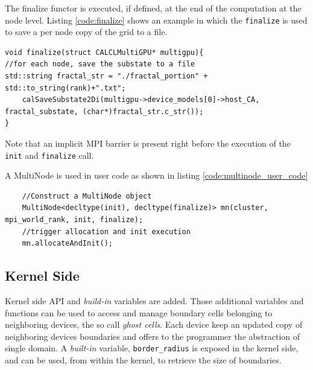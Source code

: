 The finalize functor is executed, if defined, at the end of the computation at the node level. Listing \ref{code:finalize} shows an example in which the \texttt{finalize} is used to save a per node copy of the grid to a file.
\begin{lstlisting}
void finalize(struct CALCLMultiGPU* multigpu){
//for each node, save the substate to a file
std::string fractal_str = "./fractal_portion" + std::to_string(rank)+".txt";
	calSaveSubstate2Di(multigpu->device_models[0]->host_CA, fractal_substate, (char*)fractal_str.c_str());
}
\end{lstlisting}
Note that an implicit MPI barrier is present right before the execution of the \texttt{init} and \texttt{finalize} call.

A MultiNode is used in user code as shown in listing \ref{code:multinode_user_code}

\begin{lstlisting}
	//Construct a MultiNode object
	MultiNode<decltype(init), decltype(finalize)> mn(cluster, mpi_world_rank, init, finalize);
	//trigger allocation and init execution
	mn.allocateAndInit();
\end{lstlisting}

\subsection{Kernel Side }
Kernel side  API  and \textit{build-in} variables are added. Those additional variables and functions can be used to access and manage boundary cells belonging to neighboring devices, the so call \textit{ghost cells}. Each device keep an updated copy of  neighboring devices boundaries and offers to the programmer the abstraction of single domain. A \textit{built-in} variable, \texttt{border\_radius} is exposed in the kernel side, and can be used, from within the kernel, to retrieve the size of boundaries.

